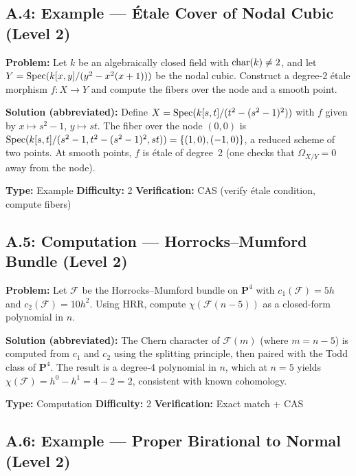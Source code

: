 \subsection*{A.4: Example --- \'Etale Cover of Nodal Cubic (Level 2)}

\begin{problembox}[title={\ecagid{0158} --- Basic Concepts}]
\textbf{Problem:} Let $k$ be an algebraically closed field with $\operatorname{char}(k) \neq 2$, and let $Y = \operatorname{Spec}(k[x,y]/(y^2 - x^2(x+1)))$ be the nodal cubic. Construct a degree-2 \'etale morphism $f: X \to Y$ and compute the fibers over the node and a smooth point.

\medskip
\textbf{Solution (abbreviated):}
Define $X = \operatorname{Spec}(k[s,t]/(t^2 - (s^2-1)^2))$ with $f$ given by $x \mapsto s^2 - 1$, $y \mapsto st$.
The fiber over the node $(0,0)$ is $\operatorname{Spec}(k[s,t]/(s^2-1, t^2-(s^2-1)^2, st)) = \{(1,0), (-1,0)\}$, a reduced scheme of two points.
At smooth points, $f$ is \'etale of degree~2 (one checks that $\Omega_{X/Y} = 0$ away from the node).

\medskip
\textbf{Type:} Example \quad \textbf{Difficulty:} 2 \quad \textbf{Verification:} CAS (verify \'etale condition, compute fibers)
\end{problembox}

\subsection*{A.5: Computation --- Horrocks--Mumford Bundle (Level 2)}

\begin{problembox}[title={\ecagid{0230} --- Computations}]
\textbf{Problem:} Let $\mathscr{F}$ be the Horrocks--Mumford bundle on $\mathbf{P}^4$ with $c_1(\mathscr{F}) = 5h$ and $c_2(\mathscr{F}) = 10h^2$. Using HRR, compute $\chi(\mathscr{F}(n-5))$ as a closed-form polynomial in $n$.

\medskip
\textbf{Solution (abbreviated):}
The Chern character of $\mathscr{F}(m)$ (where $m = n-5$) is computed from $c_1$ and $c_2$ using the splitting principle, then paired with the Todd class of $\mathbf{P}^4$.
The result is a degree-4 polynomial in $n$, which at $n=5$ yields $\chi(\mathscr{F}) = h^0 - h^1 = 4 - 2 = 2$, consistent with known cohomology.

\medskip
\textbf{Type:} Computation \quad \textbf{Difficulty:} 2 \quad \textbf{Verification:} Exact match + CAS
\end{problembox}

\subsection*{A.6: Example --- Proper Birational to Normal (Level 2)}

